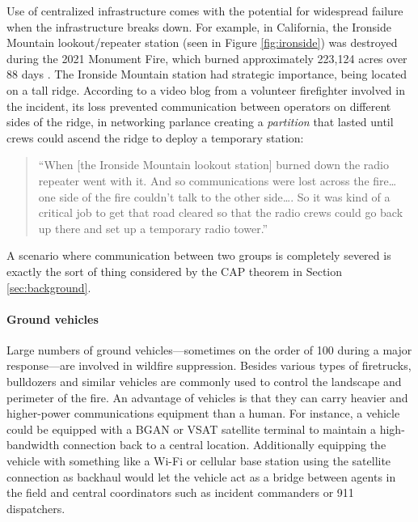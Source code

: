 \documentclass[]             %
{NASA}                       %
\theoremstyle{definition}
\begin{document}
Use of centralized infrastructure comes with the potential for
widespread failure when the infrastructure breaks down. For example,
in California, the Ironside Mountain lookout/repeater station (seen in
Figure \ref{fig:ironside}) was destroyed during the 2021 Monument
Fire, which burned approximately 223,124 acres over 88 days
\cite{2021:monumentfire}. The Ironside Mountain station had strategic
importance, being located on a tall ridge. According to a video blog
from a volunteer firefighter involved in the incident, its loss
prevented communication between operators on different sides of the
ridge, in networking parlance creating a \emph{partition} that lasted
until crews could ascend the ridge to deploy a temporary station:
\begin{quote}
  ``When {[}the Ironside Mountain lookout station{]} burned down the
  radio repeater went with it. And so communications were lost across
  the fire\ldots{} one side of the fire couldn't talk to the other
  side\ldots.  So it was kind of a critical job to get that road
  cleared so that the radio crews could go back up there and set up a
  temporary radio tower.'' \cite{2022:mechfire}%
\end{quote}
A scenario where communication between two groups is completely
severed is exactly the sort of thing considered by the CAP theorem in
Section \ref{sec:background}.

\paragraph{Ground vehicles}
Large numbers of ground vehicles---sometimes on the order of 100
during a major response---are involved in wildfire
suppression. Besides various types of firetrucks, bulldozers and
similar vehicles are commonly used to control the landscape and
perimeter of the fire. An advantage of vehicles is that they can carry
heavier and higher-power communications equipment than a human. For
instance, a vehicle could be equipped with a BGAN or VSAT satellite
terminal to maintain a high-bandwidth connection back to a central
location. Additionally equipping the vehicle with something like a
Wi-Fi or cellular base station using the satellite connection as
backhaul would let the vehicle act as a bridge between agents in the
field and central coordinators such as incident commanders or 911
dispatchers.
\end{document}
